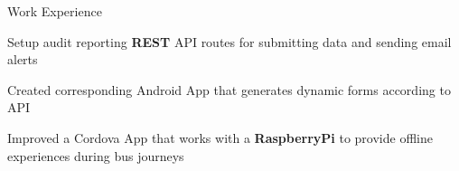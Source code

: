\documentclass[../resume.tex]{subfiles}
\begin{document}
\begin{rSection}{Work Experience}
{\begin{rSubsection}
        \item Setup audit reporting \textbf{REST} API routes for submitting data and sending email alerts
        \item Created corresponding Android App that generates dynamic forms according to API
        \item Improved a Cordova App that works with a \textbf{RaspberryPi} to provide offline experiences during bus journeys
    \end{rSubsection}
}

\end{rSection}
\end{document}

